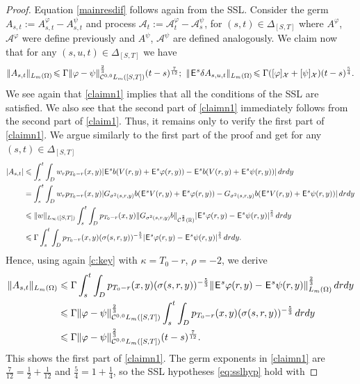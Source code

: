 \documentclass[12pt]{article}
\theoremstyle{definition}
\DeclareMathOperator{\1}{\mathbbm{1}}%
\def\E{\hskip.15ex\mathsf{E}\hskip.10ex}
\def\phi{\varphi}
\renewcommand{\le}{\leqslant}
\newcommand{\A}{\mathcal{A}}
\newcommand{\C}{\mathcal{C}}
\newcommand{\R}{\mathbb{R}}
\newcommand{\X}{\mathcal{X}}
\begin{document}
\begin{proof}
Equation \eqref{mainresdif} follows again from the SSL. Consider the germ $A_{s,t}:=A_{s,t}^\phi-A_{s,t}^\psi$ and process 
$\A_{t}:=\A_{t}^\phi-\A_{s}^\psi$, for $ (s,t)\in\Delta_{[S,T]}$
where $A^\phi$, $\A^\phi$ were define previously and $A^\psi$, $\A^\psi$ are defined analogously. 
We claim now that for any $(s,u,t)\in\Delta_{[S,T]}$ we have 
\begin{equation}\label{claimn1}
	\|A_{s,t}\|_{L_m(\Omega)}\!\le  \Gamma \|\phi-\psi\|^{\frac23}_{\C^{0,0}L_m([S,T])}(t-s)^{\frac7{12}};\,\,
	\|\E^s\delta A_{s,u,t}\|_{L_m(\Omega)}\!\le  \Gamma ([\phi]_{\X}+[\psi]_{\X})(t-s)^{\frac54}.%
\end{equation}
We see again that \eqref{claimn1}  implies that all the conditions of the SSL  are satisfied. We also see that the second part of \eqref{claimn1} immediately follows from the second part of \eqref{claim1}. Thus, it remains only to verify the first part of  \eqref{claimn1}. We argue similarly to the first part of the proof and get for any $(s,t)\in\Delta_{[S,T]}$
\begin{align*}
	|A_{s,t}|&\le \int_s^t \int_D w_r  p_{T_0-r}(x,y) |\E^s b( V(r,y)+\E^s \phi(r,y))-\E^s b( V(r,y)+\E^s \psi(r,y))|\,dr dy\\
	&= \int_s^t \int_D w_r p_{T_0-r}(x,y) |G_{\sigma^2(s,r,y)} b(\E^s V(r,y)+\E^s\phi(r,y))-G_{\sigma^2(s,r,y)} b(\E^s V(r,y)+\E^s\psi(r,y))|\,dr dy\\
	&\le \|w\|_{L_\infty([S,T])} \int_s^t \int_D    p_{T_0-r}(x,y) \|G_{\sigma^2(s,r,y)} b\|_{\C^{\frac23}(\R)}|\E^s\phi(r,y)-\E^s\psi(r,y)|^{\frac23}\,dr dy\\
	&\le \Gamma\int_s^t \int_D p_{T_0-r}(x,y) (\sigma(s,r,y))^{-\frac53}|\E^s\phi(r,y)-\E^s\psi(r,y)|^{\frac23}\,dr dy. 
\end{align*}
Hence, using again \cref{c:key} with $ \kappa=T_0-r$, $\rho=-2$, we derive 
\begin{align*}
\|A_{s,t}\|_{L_m(\Omega)}&\le  \Gamma\int_s^t \int_D p_{T_0-r}(x,y) (\sigma(s,r,y))^{-\frac53}\|\E^s\phi(r,y)-\E^s\psi(r,y)\|^{\frac23}_{L_m(\Omega)}\,dr dy\\
&\le  \Gamma\|\phi-\psi\|^{\frac23}_{\C^{0,0}L_m([S,T])}\int_s^t \int_D p_{T_0-r}(x,y) (\sigma(s,r,y))^{-\frac53}\,dr dy\\
&\le  \Gamma\|\phi-\psi\|^{\frac23}_{\C^{0,0}L_m([S,T])}(t-s)^{\frac7{12}}. 
\end{align*}
This shows the first part of  \eqref{claimn1}. 
The germ exponents in \eqref{claimn1} are $\tfrac7{12}=\tfrac12+\tfrac1{12}$ and
$\tfrac54=1+\tfrac14$, so the SSL hypotheses \eqref{eq:sslhyp} hold with

\end{proof}
\end{document}
